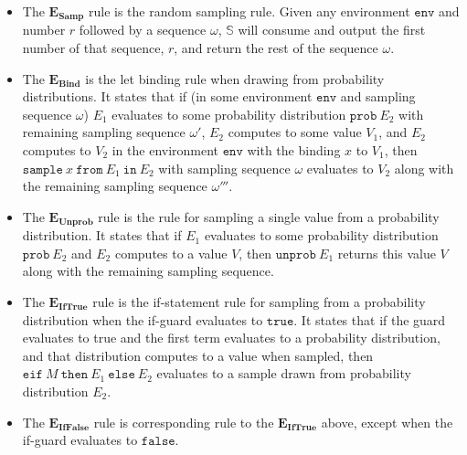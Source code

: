 \documentclass[pageno]{jpaper}
\newcommand{\env}{\mathtt{env}}
\newcommand{\prob}{\mathtt{prob} \ }
\newcommand{\mt}[1]{\mathtt{#1}}
\newcommand{\rulename}[2]{$\boldsymbol{#1}_{\textbf{#2}}$}
\begin{document}
\begin{itemize}
  \item The \rulename{E}{Samp} rule is the random sampling rule. Given any environment $\env$ and number $r$ followed by a sequence $\omega$, $\mathbb{S}$ will consume and output the first number of that sequence, $r$, and return the rest of the sequence $\omega$.
  \item The \rulename{E}{Bind} is the let binding rule when drawing from probability distributions. It states that if (in some environment $\env$ and sampling sequence $\omega$) $E_1$ evaluates to some probability distribution $\mt{prob} \ E_2$ with remaining sampling sequence $\omega'$, $E_2$ computes to some value $V_1$, and $E_2$ computes to $V_2$ in the environment $\env$ with the binding $x$ to $V_1$, then $\mt{sample} \ x \ \mt{from} \ E_1 \ \mt{in} \ E_2$ with sampling sequence $\omega$ evaluates to $V_2$ along with the remaining sampling sequence $\omega'''$.
  \item The \rulename{E}{Unprob} rule is the rule for sampling a single value from a probability distribution. It states that if $E_1$ evaluates to some probability distribution $\prob E_2$ and $E_2$ computes to a value $V$, then $\mt{unprob} \ E_1$ returns this value $V$ along with the remaining sampling sequence.
  \item The \rulename{E}{IfTrue} rule is the if-statement rule for sampling from a probability distribution when the if-guard evaluates to $\mt{true}$. It states that if the guard evaluates to true and the first term evaluates to a probability distribution, and that distribution computes to a value when sampled, then $\mt{eif} \ M \ \mt{then} \ E_1 \ \mt{else} \ E_2$ evaluates to a sample drawn from probability distribution $E_2$.
  \item The \rulename{E}{IfFalse} rule is corresponding rule to the \rulename{E}{IfTrue} above, except when the if-guard evaluates to $\mt{false}$.
\end{itemize}
\end{document}
